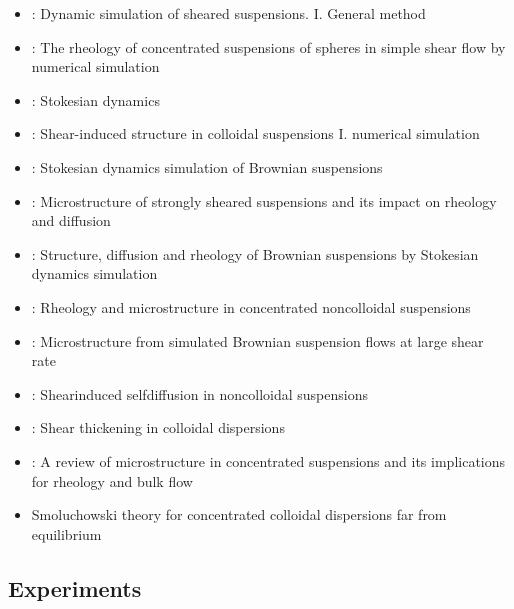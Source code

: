 \documentclass[11pt]{scrartcl}
\begin{document}
\begin{itemize}
  \item 
  \citet{Bossis_1984}:
  Dynamic simulation of sheared suspensions. I. General method
  \item
  \citet{Brady_1985}:
  The rheology of concentrated suspensions of spheres in simple shear flow by numerical simulation
  \item 
  \citet{Brady_1988}:
  Stokesian dynamics

  \item
  \citet{Bossis_1988}:
  Shear-induced structure in colloidal suspensions I. numerical simulation

  \item \citet{Phung_1996}:
  Stokesian dynamics simulation of Brownian suspensions
  \item \citet{Brady_1997}: 
  Microstructure of strongly sheared suspensions and its impact on rheology and diffusion

  \item \citet{Foss_2000}:
  Structure, diffusion and rheology of {B}rownian suspensions by {S}tokesian dynamics simulation
  \item \citet{Sierou_2002}:
  Rheology and microstructure in concentrated noncolloidal suspensions
  \item \citet{Morris_2002}:
  Microstructure from simulated Brownian suspension flows at large shear rate
  \item \citet{Sierou_2004}:
  Shearinduced selfdiffusion in noncolloidal suspensions
  \item \citet{Wagner_2009}:
  Shear thickening in colloidal dispersions
  \item \citet{Morris_2009}:
  A review of microstructure in concentrated suspensions 
  and its implications for rheology and bulk flow
 \item \citet{Nazockdast_2012}
Smoluchowski theory for concentrated colloidal dispersions far from equilibrium
\end{itemize}

\subsection*{Experiments}
\end{document}
